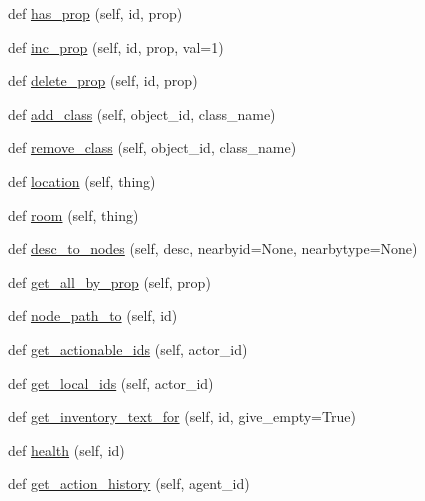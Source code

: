 \begin{DoxyCompactItemize}
\item 
def \hyperlink{classlight__chats_1_1graph_1_1Graph_aa8a44c495d154f033ea3ced4d6f2e85d}{has\+\_\+prop} (self, id, prop)
\item 
def \hyperlink{classlight__chats_1_1graph_1_1Graph_a871d833484089923fa5d1d4bb357ec7a}{inc\+\_\+prop} (self, id, prop, val=1)
\item 
def \hyperlink{classlight__chats_1_1graph_1_1Graph_ac98ed988f74d9571e195aa9592f84b76}{delete\+\_\+prop} (self, id, prop)
\item 
def \hyperlink{classlight__chats_1_1graph_1_1Graph_acb4a884cb1259a506399e8d1eb7a2f33}{add\+\_\+class} (self, object\+\_\+id, class\+\_\+name)
\item 
def \hyperlink{classlight__chats_1_1graph_1_1Graph_ab799f6160a4e8dd1550b2e245cdd2d53}{remove\+\_\+class} (self, object\+\_\+id, class\+\_\+name)
\item 
def \hyperlink{classlight__chats_1_1graph_1_1Graph_a33bf40491bd3aa15e65987377b3d580f}{location} (self, thing)
\item 
def \hyperlink{classlight__chats_1_1graph_1_1Graph_a90e0b9f3f4a4acc29c49cc730aad1539}{room} (self, thing)
\item 
def \hyperlink{classlight__chats_1_1graph_1_1Graph_a67fd9624112a695cd6e1a0b92ec3139b}{desc\+\_\+to\+\_\+nodes} (self, desc, nearbyid=None, nearbytype=None)
\item 
def \hyperlink{classlight__chats_1_1graph_1_1Graph_a4d86c4e411c724a8e169060335314d90}{get\+\_\+all\+\_\+by\+\_\+prop} (self, prop)
\item 
def \hyperlink{classlight__chats_1_1graph_1_1Graph_a20da62a3d5411d93fe820accdd06fa33}{node\+\_\+path\+\_\+to} (self, id)
\item 
def \hyperlink{classlight__chats_1_1graph_1_1Graph_a04cea64dfded92bfd69055e184aa390d}{get\+\_\+actionable\+\_\+ids} (self, actor\+\_\+id)
\item 
def \hyperlink{classlight__chats_1_1graph_1_1Graph_a4fa84ee088a8086336cf51a1c41a0477}{get\+\_\+local\+\_\+ids} (self, actor\+\_\+id)
\item 
def \hyperlink{classlight__chats_1_1graph_1_1Graph_a8f2b0882918768e199aee89cf08bde41}{get\+\_\+inventory\+\_\+text\+\_\+for} (self, id, give\+\_\+empty=True)
\item 
def \hyperlink{classlight__chats_1_1graph_1_1Graph_a3709592a97b55342b767bedb9db16267}{health} (self, id)
\item 
def \hyperlink{classlight__chats_1_1graph_1_1Graph_ac6f61220197d0eb8314fb98f6dd6f135}{get\+\_\+action\+\_\+history} (self, agent\+\_\+id)

\end{DoxyCompactItemize}
